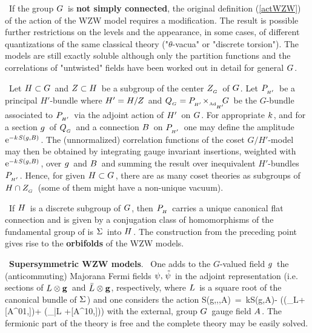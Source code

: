  \ If the group \s$G\hspace{0.05cm}$ is {\bf not simply connected},
the original definition (\ref{actWZW}) of the action
of the WZW model requires a modification. The result
is possible further restrictions on the levels and
the appearance, in some cases, of different quantizations
of the same classical theory ("$\theta$-vacua" or "discrete
torsion"). The models are still exactly soluble
although only the partition functions and the correlations
of "untwisted" fields have been worked out in detail
for general \s$G\hspace{0.025cm}$.
\vskip 0.4cm

 \ Let \s$H\subset G\hspace{0.05cm}$ and \s$Z\subset H\hspace{0.05cm}$
be a subgroup of the center \s$Z_{_G}\hspace{0.05cm}$ of \s$G\hspace{0.025cm}$.
\m Let \s$P_{_{H'}}\hspace{0.05cm}$ be a principal \s$H'$-bundle
where \s$H'=H/Z\hspace{0.025cm}$ and \s$Q_{_G}=P_{_{H'}}\hs{-0.06cm}
\times_{_{{\rm Ad}_{_{H'}}}}\hs{-0.2cm}G\s$ be the \s$G$-bundle
associated to \s$P_{_{H'}}\hspace{0.05cm}$
via the adjoint action of \s$H'\hspace{0.05cm}$ on \s$G\hspace{0.025cm}$. \m For
appropriate \s$k\hspace{0.025cm}$, \m and for
a section \s$g\hspace{0.05cm}$ of \s$Q_{_G}\hspace{0.05cm}$ and
a connection \s$B\hspace{0.05cm}$ on \s$P_{_{H'}}\hspace{0.05cm}$ one may define
the amplitude \s${\rm e}^{-k\hspace{0.025cm} S(g,B)}\hspace{0.025cm}$. \m The (unnormalized)
correlation functions of the coset \s$G/H'$-model
may then be obtained by integrating
gauge invariant insertions, weighted with
\s${\rm e}^{-k\hspace{0.025cm} S(g,B)}\hspace{0.025cm}$, \m over \s$g\hspace{0.05cm}$ and \s$B\hspace{0.05cm}$
and summing the result over inequivalent \s$H'$-bundles
\s$P_{_{H'}}\hspace{0.025cm}$. \m Hence, for given \s$H\subset
G\hspace{0.05cm}$, there are as many coset theories as subgroups
of \s$H\cap Z_{_G}\hspace{0.05cm}$
(some of them might have a non-unique vacuum).
\vskip 0.4cm

 \ If \s$H\hspace{0.05cm}$ is a discrete subgroup of \s$G\hspace{0.025cm}$,
then \s$P_{_H}\hspace{0.05cm}$ carries a unique canonical flat connection
and is given by a conjugation class of homomorphisms
of the fundamental group of is \s$\Sigma\hspace{0.05cm}$ into \s$H\hspace{0.025cm}$.
\m The construction from the preceding point gives rise to the
{\bf orbifolds} of the WZW models.
\vskip 0.4cm

 \ {\bf Supersymmetric WZW models}. \ One adds to the
\s$G$-valued field \s$g\hspace{0.05cm}$ the (anticommuting) Majorana
Fermi fields \s$\psi,\hspace{0.05cm}\tilde\psi\hspace{0.025cm}$ in the adjoint representation
(i.e. sections of \s$L\otimes{\bf g}\hspace{0.05cm}$ and \s$\bar L\otimes{\bf g}\hspace{0.025cm}$,
\m respectively, where \s$L\hspace{0.05cm}$ is a square root of the canonical
bundle of \s$\Sigma\hspace{0.025cm}$) and one considers the action
\qq
S(g,\psi,\tilde\psi,A)\ =\ k\m S(g,A)\s-\s{_2\over^{\pi}}
\int\tr\s\left(\psi\m(\de_L+[A^{01},\s\cdot\s\m]\m)\m\psi\s+\s
\tilde\psi\m(\da_{\bar L}
+[A^{10},\s\cdot\s\m]\m)\m\tilde\psi\right)
\label{SUWZW}
\qqq
with the external, group \s$G\hspace{0.05cm}$ gauge field \s$A\hspace{0.025cm}$. \m
The fermionic part of the theory is free and the complete
theory may be easily solved.
\vskip 0.4cm

